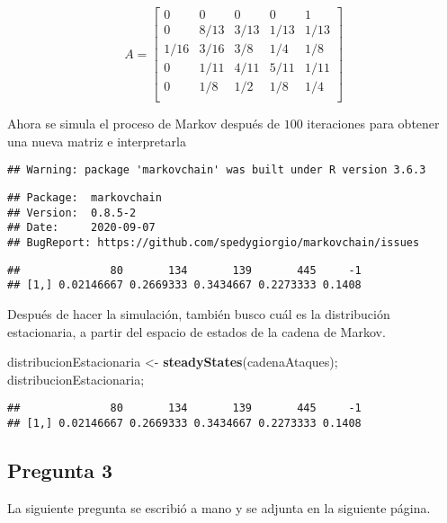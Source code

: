 \documentclass[
]{article}
\newenvironment{Shaded}{\begin{snugshade}}{\end{snugshade}}
\newcommand{\KeywordTok}[1]{\textcolor[rgb]{0.13,0.29,0.53}{\textbf{#1}}}
\newcommand{\NormalTok}[1]{#1}
\newcommand{\StringTok}[1]{\textcolor[rgb]{0.31,0.60,0.02}{#1}}
\begin{document}
\[\begin{equation}
    A = \begin{bmatrix}
        0 & 0 & 0 & 0 & 1 \\
        0 & 8/13 & 3/13 & 1/13 & 1/13 \\
        1/16 & 3/16 & 3/8 & 1/4 & 1/8 \\
        0 & 1/11 & 4/11 & 5/11 & 1/11 \\
        0 & 1/8 & 1/2 & 1/8 & 1/4 \\
        \end{bmatrix}
\end{equation}\]

Ahora se simula el proceso de Markov después de \(100\) iteraciones para
obtener una nueva matriz e interpretarla

\begin{verbatim}
## Warning: package 'markovchain' was built under R version 3.6.3
\end{verbatim}

\begin{verbatim}
## Package:  markovchain
## Version:  0.8.5-2
## Date:     2020-09-07
## BugReport: https://github.com/spedygiorgio/markovchain/issues
\end{verbatim}

\begin{verbatim}
##              80       134       139       445     -1
## [1,] 0.02146667 0.2669333 0.3434667 0.2273333 0.1408
\end{verbatim}

Después de hacer la simulación, también busco cuál es la distribución
estacionaria, a partir del espacio de estados de la cadena de Markov.

\begin{Shaded}
\begin{Highlighting}[]
\NormalTok{distribucionEstacionaria <-}\StringTok{ }\KeywordTok{steadyStates}\NormalTok{(cadenaAtaques); }
\NormalTok{distribucionEstacionaria;}
\end{Highlighting}
\end{Shaded}

\begin{verbatim}
##              80       134       139       445     -1
## [1,] 0.02146667 0.2669333 0.3434667 0.2273333 0.1408
\end{verbatim}

\hypertarget{pregunta-3}{%
\subsection{Pregunta 3}\label{pregunta-3}}

La siguiente pregunta se escribió a mano y se adjunta en la siguiente
página.
\end{document}
